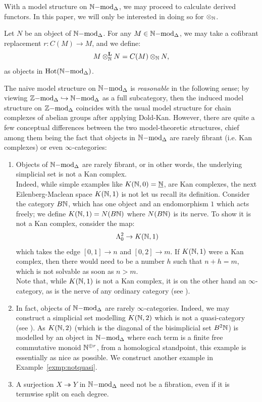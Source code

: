 With a model structure on ${\mathbb{N}\mathrm{-mod}}_{\Delta}$, we may proceed to calculate derived functors. In this paper, we will only be interested in doing so for $\otimes_{\mathbb{N}}$.
\begin{definition}
Let $N$ be an object of ${\mathbb{N}\mathrm{-mod}}_{\Delta}$. For any $M \in {\mathbb{N}\mathrm{-mod}}_{\Delta}$, we may take a cofibrant replacement $r: C(M) \to M$, and we define:
\[M \otimes^{\boldsymbol{\mathrm{L}}}_{\mathbb{N}} N = C(M) \otimes_{\mathbb{N}} N,\]
as objects in $\operatorname{Hot}({\mathbb{N}\mathrm{-mod}}_{\Delta})$.
\end{definition}
The naive model structure on ${\mathbb{N}\mathrm{-mod}}_{\Delta}$ is \textit{reasonable} in the following sense; by viewing $\mathbb{Z}\mathrm{-mod}_{\Delta} \hookrightarrow \mathbb{N}\mathrm{-mod}_{\Delta}$ 
as a full subcategory, then the induced model structure on ${\mathbb{Z}\mathrm{-mod}}_{\Delta}$ coincides with the usual model structure for chain complexes 
of abelian groups after applying Dold-Kan. However, there are quite a few conceptual differences between the two model-theoretic structures,
chief among them being the fact that objects in ${\mathbb{N}\mathrm{-mod}}_{\Delta}$ are rarely fibrant (i.e. Kan complexes) or even $\infty$-categories:
\begin{example}
\begin{enumerate}
\item[(a)] Objects of ${\mathbb{N}\mathrm{-mod}}_{\Delta}$ are rarely fibrant, or in other words, the underlying simplicial set is not a Kan complex.\\
\indent Indeed, while simple examples like $K(\mathbb{N},0) = \underline{\mathbb{N}}$, are Kan complexes, the next Eilenberg-Maclean space $K(\mathbb{N},1)$ is not \textemdash let us recall its definition. 
Consider the category $B\mathbb{N}$, which has one object and an endomorphism $1$ which acts freely; we define $K(\mathbb{N},1)=N(B\mathbb{N})$ where $N(B\mathbb{N})$ is its nerve. 
To show it is not a Kan complex, consider the map:
  \[\Lambda^2_{0} \rightarrow K(\mathbb{N},1)\]
  which takes the edge $[0,1] \to n$ and $[0,2] \to m$. If $K(\mathbb{N},1)$ were a Kan complex, then there would need to be a 
  number $h$ such that $n + h = m$, which is not solvable as soon as $n > m$.\\
  \indent Note that, while $K(\mathbb{N},1)$ is not a Kan complex, it is on the other hand an $\infty$-category, as is the nerve of any 
  ordinary category (see \cite[1.3]{keradon}).
\item[(b)] In fact, objects of ${\mathbb{N}\mathrm{-mod}}_{\Delta}$ are rarely $\infty$-categories. Indeed, we may construct a simplicial set 
modelling $K(\mathbb{N},2)$ which is not a quasi-category (see \cite{notquasi}). As $K(\mathbb{N},2)$ (which is the diagonal of the 
bisimplicial set $B^2 \mathbb{N}$) is modelled by an object in ${\mathbb{N}\mathrm{-mod}}_{\Delta}$ where each term is a finite free 
commutative monoid $\mathbb{N}^{\oplus r}$, 
from a homological standpoint, this example is essentially as nice as possible. 
We construct another example in Example~\ref{exmp:notquasi}.
\item[(c)] A surjection $X \twoheadrightarrow Y$ in ${\mathbb{N}\mathrm{-mod}}_{\Delta}$ need not be a fibration, even if it is termwise split on each degree.
\end{enumerate}
\end{example}
